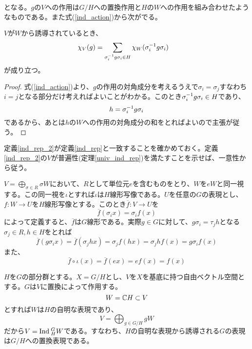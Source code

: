 \documentclass{ltjsarticle}
\begin{document}
となる。$g$の$V$への作用は$G/H$への置換作用と$H$の$W$への作用を組み合わせたようなものである。また式(\ref{ind_action})から次がでる。

\begin{prop}[誘導表現の指標]\label{ind_char}
  $V$が$W$から誘導されているとき、
  \begin{align}
  \chi_V(g)&=\sum_{\sigma_i^{-1}g\sigma_i\in H}\chi_W(\sigma_i^{-1}g\sigma_i)
\end{align}
が成り立つ。
\end{prop}

\begin{proof}
  式(\ref{ind_action})より、$g$の作用の対角成分を考えるうえで$\sigma_i=\sigma_j$すなわち$i=j$となる部分だけ考えればよいことがわかる。このとき$\sigma_i^{-1}g\sigma_i\in H$であり、
  \[
  h=\sigma_i^{-1}g\sigma_i 
  \]
  であるから、あとは$h$の$W$への作用の対角成分の和をとればよいので主張が従う。
\end{proof}

定義\ref{ind_rep_2}が定義\ref{ind_rep}と一致することを確かめておく。定義\ref{ind_rep_2}の$V$が普遍性(定理\ref{univ_ind_rep})を満たすことを示せば、一意性から従う。

$V=\bigoplus_{\sigma\in R}\sigma W$において、$R$として単位元$e$を含むものをとり、$W$を$eW$と同一視する。この同一視を$\iota$とすれば$\iota$は$H$線形写像である。$U$を任意の$G$の表現とし、$f:W\rightarrow U$を$H$線形写像とする。このとき$\overline{f}:V\rightarrow U$を
\[
\overline{f}(\sigma_i x)=\sigma_i f(x)
\]
によって定義すると、$\overline{f}$は$G$線形である。実際$g\in G$に対して、$g\sigma_i =\tau_j h$となる$\sigma_j\in R, h\in H$をとれば
\[
\overline{f}(g\sigma_i x)=\overline{f}(\sigma_j hx)=\sigma_jf(hx)=\sigma_jhf(x)=g\sigma_if(x)  
\]
また、
\[
\overline{f}\circ\iota(x)=\overline{f}(ex)=ef(x)=f(x)  
\]



\begin{eg}
  $H$を$G$の部分群とする。$X=G/H$とし、$V$を$X$を基底に持つ自由ベクトル空間とする。$G$は$V$に置換によって作用する。
  \[
  W=\mathbb{C} H\subset V  
  \]
  とすれば$W$は$H$の自明な表現であり、
  \[
  V=\bigoplus_{g\in G/H}gW
  \]
  だから$V=\text{Ind}\:_H^GW$である。すなわち、$H$の自明な表現から誘導される$G$の表現は$G/H$への置換表現である。
\end{eg}
\end{document}

